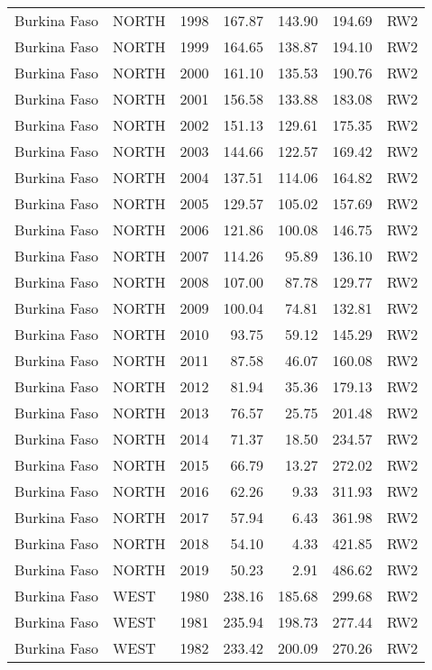 \begin{longtable}{lllrrrl}
  Burkina Faso & NORTH & 1998 & 167.87 & 143.90 & 194.69 & RW2 \\ 
  Burkina Faso & NORTH & 1999 & 164.65 & 138.87 & 194.10 & RW2 \\ 
  Burkina Faso & NORTH & 2000 & 161.10 & 135.53 & 190.76 & RW2 \\ 
  Burkina Faso & NORTH & 2001 & 156.58 & 133.88 & 183.08 & RW2 \\ 
  Burkina Faso & NORTH & 2002 & 151.13 & 129.61 & 175.35 & RW2 \\ 
  Burkina Faso & NORTH & 2003 & 144.66 & 122.57 & 169.42 & RW2 \\ 
  Burkina Faso & NORTH & 2004 & 137.51 & 114.06 & 164.82 & RW2 \\ 
  Burkina Faso & NORTH & 2005 & 129.57 & 105.02 & 157.69 & RW2 \\ 
  Burkina Faso & NORTH & 2006 & 121.86 & 100.08 & 146.75 & RW2 \\ 
  Burkina Faso & NORTH & 2007 & 114.26 & 95.89 & 136.10 & RW2 \\ 
  Burkina Faso & NORTH & 2008 & 107.00 & 87.78 & 129.77 & RW2 \\ 
  Burkina Faso & NORTH & 2009 & 100.04 & 74.81 & 132.81 & RW2 \\ 
  Burkina Faso & NORTH & 2010 & 93.75 & 59.12 & 145.29 & RW2 \\ 
  Burkina Faso & NORTH & 2011 & 87.58 & 46.07 & 160.08 & RW2 \\ 
  Burkina Faso & NORTH & 2012 & 81.94 & 35.36 & 179.13 & RW2 \\ 
  Burkina Faso & NORTH & 2013 & 76.57 & 25.75 & 201.48 & RW2 \\ 
  Burkina Faso & NORTH & 2014 & 71.37 & 18.50 & 234.57 & RW2 \\ 
  Burkina Faso & NORTH & 2015 & 66.79 & 13.27 & 272.02 & RW2 \\ 
  Burkina Faso & NORTH & 2016 & 62.26 & 9.33 & 311.93 & RW2 \\ 
  Burkina Faso & NORTH & 2017 & 57.94 & 6.43 & 361.98 & RW2 \\ 
  Burkina Faso & NORTH & 2018 & 54.10 & 4.33 & 421.85 & RW2 \\ 
  Burkina Faso & NORTH & 2019 & 50.23 & 2.91 & 486.62 & RW2 \\ 
  Burkina Faso & WEST & 1980 & 238.16 & 185.68 & 299.68 & RW2 \\ 
  Burkina Faso & WEST & 1981 & 235.94 & 198.73 & 277.44 & RW2 \\ 
  Burkina Faso & WEST & 1982 & 233.42 & 200.09 & 270.26 & RW2 \\ 

\end{longtable}
